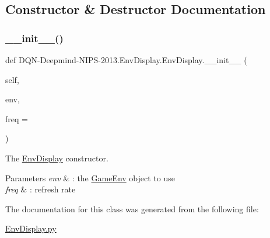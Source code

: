 \subsection{Constructor \& Destructor Documentation}
\hypertarget{classDQN-Deepmind-NIPS-2013_1_1EnvDisplay_1_1EnvDisplay_ad60e1788026fe76998cc85b558d9311f}{}\label{classDQN-Deepmind-NIPS-2013_1_1EnvDisplay_1_1EnvDisplay_ad60e1788026fe76998cc85b558d9311f} 
\subsubsection{\texorpdfstring{\+\_\+\+\_\+init\+\_\+\+\_\+()}{\_\_init\_\_()}}
{\footnotesize\ttfamily def D\+QN-\/Deepmind-\/N\+I\+PS-\/2013.Env\+Display.\+Env\+Display.\+\_\+\+\_\+init\+\_\+\+\_\+ (\begin{DoxyParamCaption}\item[{}]{self,  }\item[{}]{env,  }\item[{}]{freq = {} }\end{DoxyParamCaption})}



The \hyperlink{classDQN-Deepmind-NIPS-2013_1_1EnvDisplay_1_1EnvDisplay}{Env\+Display} constructor. 


\begin{DoxyParams}{Parameters}
{\em env} & \+: the \hyperlink{namespaceDQN-Deepmind-NIPS-2013_1_1GameEnv}{Game\+Env} object to use \\
\hline
{\em freq} & \+: refresh rate \\
\hline
\end{DoxyParams}


The documentation for this class was generated from the following file\+:\begin{DoxyCompactItemize}
\item 
\hyperlink{EnvDisplay_8py}{Env\+Display.\+py}\end{DoxyCompactItemize}
